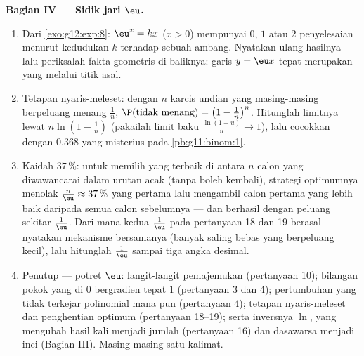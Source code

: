 \begin{problem}
\medskip
\noindent\textbf{Bagian IV --- Sidik jari $\eu$.}
\begin{enumerate}[resume]
  \item Dari \cref{exo:g12:exp:8}: 
        $\eu^x = kx$ ($x > 0$) mempunyai $0$, $1$ atau $2$ penyelesaian
        menurut kedudukan $k$ terhadap sebuah
        ambang. Nyatakan ulang hasilnya --- lalu periksalah fakta
        geometris di baliknya: garis $y = \eu x$ tepat merupakan   yang melalui titik asal.
  \item Tetapan nyaris-meleset: dengan $n$ karcis undian yang
        masing-masing berpeluang menang $\frac1n$,
        $\P(\text{tidak menang}) = \left(1 - \frac1n\right)^n$.
        Hitunglah limitnya lewat
        $n \ln\!\left(1 - \frac1n\right)$ (pakailah limit baku
        $\frac{\ln(1 + u)}{u} \to 1$), lalu cocokkan dengan
        $0.368$ yang misterius pada \cref{pb:g11:binom:1}.
  \item Kaidah $37\,\%$: untuk memilih yang terbaik di antara $n$
        calon yang diwawancarai dalam urutan acak (tanpa boleh kembali),
        strategi optimumnya menolak
        $\frac{n}{\eu} \approx 37\,\%$ yang pertama lalu mengambil calon
        pertama yang lebih baik daripada semua calon sebelumnya --- dan
        berhasil dengan peluang sekitar $\frac1\eu$. Dari mana kedua
        $\frac1\eu$ pada pertanyaan 18 dan 19 berasal ---
        nyatakan mekanisme bersamanya (banyak  saling bebas yang
        berpeluang kecil), lalu hitunglah $\frac1\eu$ sampai tiga
        angka desimal.
  \item Penutup --- potret $\eu$: langit-langit pemajemukan
        (pertanyaan 10); bilangan pokok yang  di $0$
        bergradien tepat $1$ (pertanyaan 3 dan 4); pertumbuhan yang tidak
        terkejar polinomial mana pun (pertanyaan 4); tetapan
        nyaris-meleset dan penghentian optimum (pertanyaan 18--19);
        serta inversnya $\ln$, yang mengubah hasil kali menjadi jumlah
        (pertanyaan 16) dan dasawarsa menjadi inci (Bagian III). Masing-masing
        satu kalimat.

\end{enumerate}
\end{problem}
